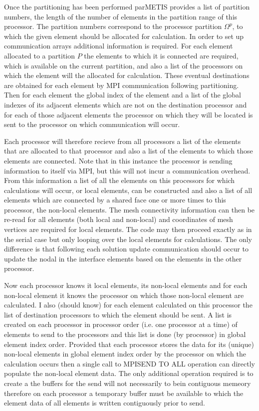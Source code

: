Once the partitioning has been performed parMETIS provides a list of partition numbers, the length of the number of elements in the partition range of this processor. The partition numbers correspond to the processor partition $\Omega^p$, to which the given element should be allocated for calculation. In order to set up communication arrays additional information is required. For each element allocated to a partition $P$ the elements to which it is connected are required, which is available on the current partition, and also a list of the processors on which the element will the allocated for calculation. These eventual destinations are obtained for each element by MPI communication following partitioning. Then for each element the global index of the element and a list of the global indexes of its adjacent elements which are not on the destination processor and for each of those adjacent elements the processor on which they will be located is sent to the processor on which communication will occur.

Each processor will therefore recieve from all processors a list of the elements that are allocated to that processor and also a list of the elements to which those elements are connected. Note that in this instance the processor is sending information to itself via MPI, but this will not incur a communication overhead. From this information a list of all the elements on this processors for which calculations will occur, or local elements, can be constructed and also a list of all elements which are connected by a shared face one or more times to this processor, the non-local elements. The mesh connectivity information can then be re-read for all elements (both local and non-local) and coordinates of mesh vertices are required for local elements. The code may then proceed exactly as in the serial case but only looping over the local elements for calculations. The only difference is that following each solution update communication should occur to update the nodal in the interface elements based on the elements in the other processor.

Now each processor knows it local elements, its non-local elements and for each non-local element it knows the processor on which those non-local element are calculated. I also (should know) for each element calculated on this processor the list of destination processors to which the element should be sent. A list is created on each processor in processor order (i.e. one processor at a time) of elements to send to the processors and this list is done (by processor) in global element index order. Provided that each processor stores the data for its (unique) non-local elements in global element index order by the processor on which the calculation occurs then a single call to MPI\textunderscore SEND \textunderscore TO \textunderscore ALL operation can directly populate the non-local element data. The only additional operation required is to create a the buffers for the send will not necessarily to bein contiguous memeory therefore on each processor a temporary buffer must be available to which the element data of all elements is written contiguously prior to send.

